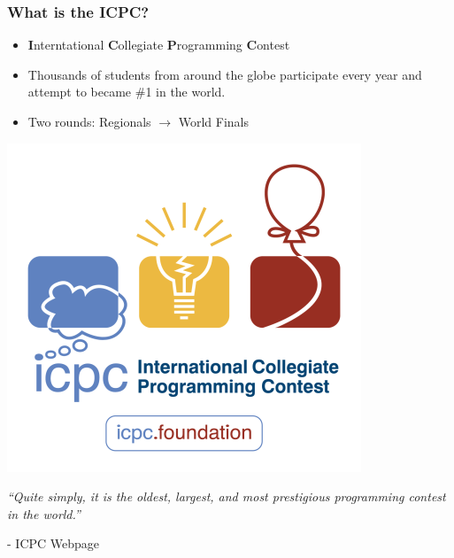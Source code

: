 \documentclass{beamer}
\begin{document}
\begin{frame}
	\frametitle{What is the ICPC?}

	\begin{itemize}
		\item \textbf{I}nterntational \textbf{C}ollegiate \textbf{P}rogramming \textbf{C}ontest
		\item Thousands of students from around the globe participate every year and attempt to became \#1 in the world.
		\item Two rounds: Regionals $\rightarrow$ World Finals
	\end{itemize}

	\begin{minipage}{0.25\linewidth}
		\includegraphics[width=1\linewidth]{images/ICPC}
	\end{minipage}
	\hfill
	\begin{minipage}{0.7\linewidth}
		\textit{``Quite simply, it is the oldest, largest, and most prestigious programming contest in the world.''}
		\begin{flushright}
			- ICPC Webpage
		\end{flushright}
	\end{minipage}
\end{frame}
\end{document}
